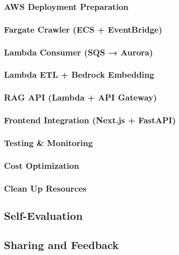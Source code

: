 \subsubsection{AWS Deployment Preparation}


\subsubsection{Fargate Crawler (ECS + EventBridge)}


\subsubsection{Lambda Consumer (SQS → Aurora)}


\subsubsection{Lambda ETL + Bedrock Embedding}


\subsubsection{RAG API (Lambda + API Gateway)}


\subsubsection{Frontend Integration (Next.js + FastAPI)}


\subsubsection{Testing \& Monitoring}


\subsubsection{Cost Optimization}


\subsubsection{Clean Up Resources}


\newpage

\subsection{Self-Evaluation}



\newpage

\subsection{Sharing and Feedback}



\newpage

